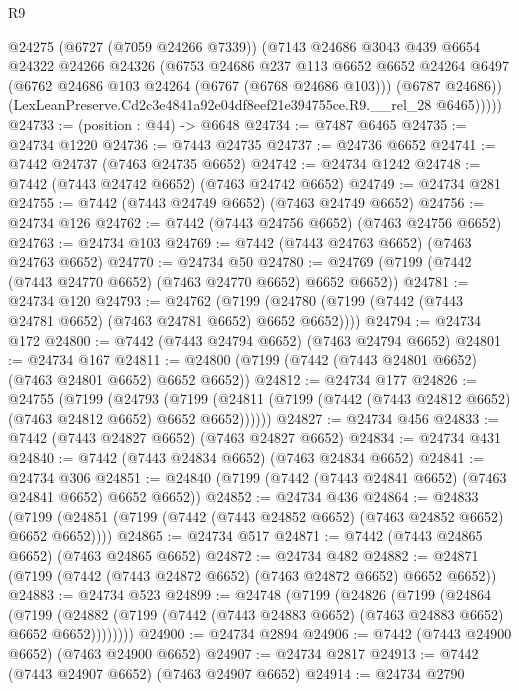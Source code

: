 \begin{lexlean}{R9}
\begin{coremodule}
          @24275
          (@6727 (@7059 @24266 @7339))
          (@7143
            @24686
            @3043
            @439
            @6654
            @24322
            @24266
            @24326
            (@6753
              @24686
              @237
              @113
              @6652
              @6652
              @24264
              @6497
              (@6762 @24686 @103 @24264 (@6767 (@6768 @24686 @103)))
              (@6787 @24686))
            (LexLeanPreserve.Cd2c3e4841a92e04df8eef21e394755ce.R9.__rel_28 @6465)))))
@24733 := (position : @44) -> @6648
@24734 := @7487 @6465
@24735 := @24734 @1220
@24736 := @7443 @24735
@24737 := @24736 @6652
@24741 := @7442 @24737 (@7463 @24735 @6652)
@24742 := @24734 @1242
@24748 := @7442 (@7443 @24742 @6652) (@7463 @24742 @6652)
@24749 := @24734 @281
@24755 := @7442 (@7443 @24749 @6652) (@7463 @24749 @6652)
@24756 := @24734 @126
@24762 := @7442 (@7443 @24756 @6652) (@7463 @24756 @6652)
@24763 := @24734 @103
@24769 := @7442 (@7443 @24763 @6652) (@7463 @24763 @6652)
@24770 := @24734 @50
@24780 := @24769 (@7199 (@7442 (@7443 @24770 @6652) (@7463 @24770 @6652) @6652 @6652))
@24781 := @24734 @120
@24793 := @24762
    (@7199 (@24780 (@7199 (@7442 (@7443 @24781 @6652) (@7463 @24781 @6652) @6652 @6652))))
@24794 := @24734 @172
@24800 := @7442 (@7443 @24794 @6652) (@7463 @24794 @6652)
@24801 := @24734 @167
@24811 := @24800 (@7199 (@7442 (@7443 @24801 @6652) (@7463 @24801 @6652) @6652 @6652))
@24812 := @24734 @177
@24826 := @24755
    (@7199
      (@24793
        (@7199 (@24811 (@7199 (@7442 (@7443 @24812 @6652) (@7463 @24812 @6652) @6652 @6652))))))
@24827 := @24734 @456
@24833 := @7442 (@7443 @24827 @6652) (@7463 @24827 @6652)
@24834 := @24734 @431
@24840 := @7442 (@7443 @24834 @6652) (@7463 @24834 @6652)
@24841 := @24734 @306
@24851 := @24840 (@7199 (@7442 (@7443 @24841 @6652) (@7463 @24841 @6652) @6652 @6652))
@24852 := @24734 @436
@24864 := @24833
    (@7199 (@24851 (@7199 (@7442 (@7443 @24852 @6652) (@7463 @24852 @6652) @6652 @6652))))
@24865 := @24734 @517
@24871 := @7442 (@7443 @24865 @6652) (@7463 @24865 @6652)
@24872 := @24734 @482
@24882 := @24871 (@7199 (@7442 (@7443 @24872 @6652) (@7463 @24872 @6652) @6652 @6652))
@24883 := @24734 @523
@24899 := @24748
    (@7199
      (@24826
        (@7199
          (@24864
            (@7199
              (@24882 (@7199 (@7442 (@7443 @24883 @6652) (@7463 @24883 @6652) @6652 @6652))))))))
@24900 := @24734 @2894
@24906 := @7442 (@7443 @24900 @6652) (@7463 @24900 @6652)
@24907 := @24734 @2817
@24913 := @7442 (@7443 @24907 @6652) (@7463 @24907 @6652)
@24914 := @24734 @2790

\end{coremodule}
\end{lexlean}
